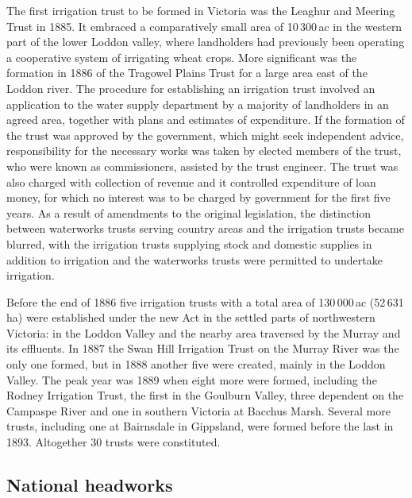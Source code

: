 The first irrigation trust to be formed in Victoria was the Leaghur
and Meering Trust in 1885.  It embraced a comparatively small area of 10\,300\,ac
in the western part of the lower Loddon valley, where landholders had
previously been operating a cooperative system of irrigating wheat
crops.  More significant was the formation in 1886 of the Tragowel
Plains Trust for a large area east of the Loddon river.  The procedure
for establishing an irrigation trust involved an application to the
water supply department by a majority of landholders in an agreed
area, together with plans and estimates of expenditure.  If the
formation of the trust was approved by the government, which might
seek independent advice, responsibility for the necessary works was
taken by elected members of the trust, who were known as
commissioners, assisted by the trust engineer.  The trust was also
charged with collection of revenue and it controlled expenditure of
loan money, for which no interest was to be charged by government for
the first five years.  As a result of amendments to the original
legislation, the distinction between waterworks trusts serving country
areas and the irrigation trusts became blurred, with the irrigation
trusts supplying stock and domestic supplies in addition to irrigation
and the waterworks trusts were permitted to undertake irrigation.

Before the end of 1886 five irrigation trusts with a total area of
130\,000\,ac (52\,631\,ha) were established under the new Act in the
settled parts of northwestern Victoria: in the Loddon Valley and the
nearby area traversed by the Murray and its effluents.  In 1887 the
Swan Hill Irrigation Trust on the Murray River was the only one
formed, but in 1888 another five were created, mainly in the Loddon
Valley.  The peak year was 1889 when eight more were formed, including
the Rodney Irrigation Trust, the first in the Goulburn Valley, three
dependent on the Campaspe River and one in southern Victoria at
Bacchus Marsh.  Several more trusts, including one at Bairnsdale in
Gippsland, were formed before the last in 1893.  Altogether 30 trusts
were constituted.

\subsection*{National headworks}

